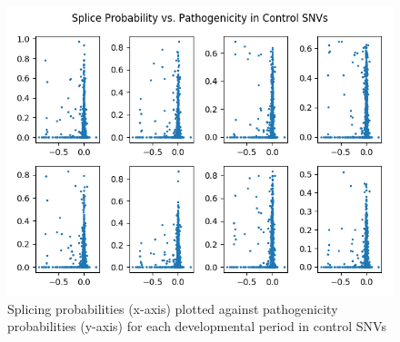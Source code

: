 \documentclass[12pt]{article}
\begin{document}
\begin{figure}[ht]
\centering
    \includegraphics[width=\textwidth,height=\textheight,keepaspectratio]{../analysis/neg_corr.png}
    \caption{Splicing probabilities (x-axis) plotted against pathogenicity probabilities (y-axis) for each developmental period in control SNVs}
\end{figure}

\pagebreak
\end{document}
